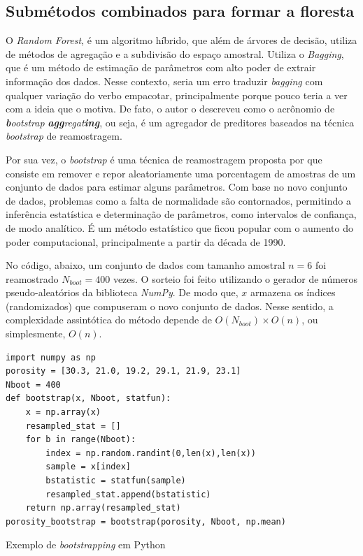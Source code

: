 \documentclass[12pt]{article}
\begin{document}
\subsection{Submétodos combinados para formar a floresta}

O \textit{Random Forest}, é um algoritmo híbrido, que além de árvores de decisão, utiliza de métodos de agregação e a subdivisão do espaço amostral. Utiliza o \textit{Bagging}, que é um método de estimação de parâmetros com alto poder de extrair informação dos dados. Nesse contexto, seria um erro traduzir \textit{bagging} com qualquer variação do verbo empacotar, principalmente porque pouco teria a ver com a ideia que o motiva. De fato, o autor \cite{Breiman_1996} o descreveu como o acrônomio de \emph{\textbf{b}ootstrap} \emph{\textbf{agg}regat\textbf{ing}}, ou seja, é um agregador de preditores baseados na técnica \textit{bootstrap} de reamostragem. 

Por sua vez, o \textit{bootstrap} é uma técnica de reamostragem proposta por \cite{Efron_1993} que consiste em remover e repor aleatoriamente uma porcentagem de amostras de um conjunto de dados para estimar alguns parâmetros. Com base no novo conjunto de dados, problemas como a falta de normalidade são contornados, permitindo a inferência estatística e determinação de parâmetros, como intervalos de confiança, de modo analítico. É um método estatístico que ficou popular com o aumento do poder computacional, principalmente a partir da década de 1990.

No código, abaixo, um conjunto de dados com tamanho amostral $n=6$ foi reamostrado $N_{boot}=400$ vezes. O sorteio foi feito utilizando o gerador de números pseudo-aleatórios da biblioteca \textit{NumPy}\cite{Harris_2020}. De modo que, $x$ armazena os índices (randomizados) que compuseram o novo conjunto de dados. Nesse sentido, a complexidade assintótica do método depende de $O(N_{boot}) \times O(n)$, ou simplesmente, $O(n)$.

\begin{listing}[!ht]
\begin{verbatim}
import numpy as np
porosity = [30.3, 21.0, 19.2, 29.1, 21.9, 23.1]
Nboot = 400
def bootstrap(x, Nboot, statfun):
    x = np.array(x)
    resampled_stat = []
    for b in range(Nboot):
        index = np.random.randint(0,len(x),len(x))
        sample = x[index]
        bstatistic = statfun(sample)
        resampled_stat.append(bstatistic)
    return np.array(resampled_stat)
porosity_bootstrap = bootstrap(porosity, Nboot, np.mean)
\end{verbatim}
\caption{Exemplo de \emph{bootstrapping} em Python}
\end{listing}
\end{document}
